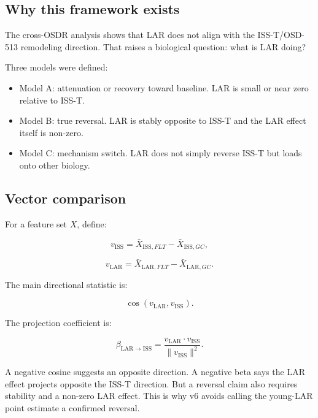 \documentclass[11pt]{article}
\begin{document}
\subsection{Why this framework exists}

The cross-OSDR analysis shows that LAR does not align with the ISS-T/OSD-513 remodeling direction. That raises a biological question: what is LAR doing?

Three models were defined:

\begin{itemize}
  \item Model A: attenuation or recovery toward baseline. LAR is small or near zero relative to ISS-T.
  \item Model B: true reversal. LAR is stably opposite to ISS-T and the LAR effect itself is non-zero.
  \item Model C: mechanism switch. LAR does not simply reverse ISS-T but loads onto other biology.
\end{itemize}

\subsection{Vector comparison}

For a feature set $X$, define:

\begin{equation}
v_{\mathrm{ISS}}=\bar{X}_{\mathrm{ISS},FLT}-\bar{X}_{\mathrm{ISS},GC},
\end{equation}

\begin{equation}
v_{\mathrm{LAR}}=\bar{X}_{\mathrm{LAR},FLT}-\bar{X}_{\mathrm{LAR},GC}.
\end{equation}

The main directional statistic is:

\begin{equation}
\cos(v_{\mathrm{LAR}},v_{\mathrm{ISS}}).
\end{equation}

The projection coefficient is:

\begin{equation}
\beta_{\mathrm{LAR}\rightarrow\mathrm{ISS}}
=\frac{v_{\mathrm{LAR}}\cdot v_{\mathrm{ISS}}}{\lVert v_{\mathrm{ISS}}\rVert^2}.
\end{equation}

A negative cosine suggests an opposite direction. A negative beta says the LAR effect projects opposite the ISS-T direction. But a reversal claim also requires stability and a non-zero LAR effect. This is why v6 avoids calling the young-LAR point estimate a confirmed reversal.
\end{document}
